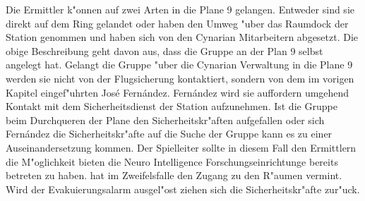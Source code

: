 \begin{remarks}
    Die Ermittler k"onnen auf zwei Arten in die Plane 9 gelangen. Entweder sind sie direkt auf dem Ring gelandet oder haben den Umweg "uber das Raumdock der Station genommen und haben sich von den Cynarian Mitarbeitern abgesetzt. Die obige Beschreibung geht davon aus, dass die Gruppe an der Plan 9 selbst angelegt hat. Gelangt die Gruppe "uber die Cynarian Verwaltung in die Plane 9 werden sie nicht von der Flugsicherung kontaktiert, sondern von dem im vorigen Kapitel eingef"uhrten Jos\'e Fern\'andez. Fern\'andez wird sie auffordern umgehend Kontakt mit dem Sicherheitsdienst der Station aufzunehmen. Ist die Gruppe beim Durchqueren der Plane den Sicherheitskr"aften aufgefallen oder sich Fern\'andez die Sicherheitskr"afte auf die Suche der Gruppe kann es zu einer Auseinandersetzung kommen. Der Spielleiter sollte in diesem Fall den Ermittlern die M"oglichkeit bieten die Neuro Intelligence Forschungseinrichtunge bereits betreten zu haben. \xl{} hat im Zweifelsfalle den Zugang zu den R"aumen vermint. Wird der Evakuierungsalarm ausgel"ost ziehen sich die Sicherheitskr"afte zur"uck.
\end{remarks}
